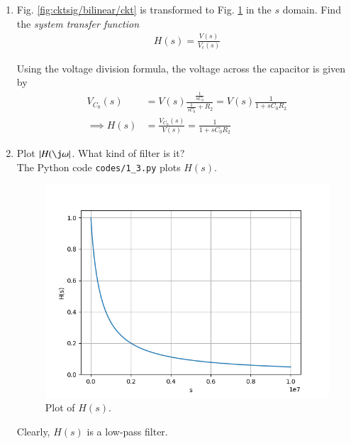 \documentclass[journal,12pt,twocolumn]{IEEEtran}
\renewcommand\thesection{\arabic{section}}
\begin{document}
\begin{enumerate}[label=\arabic*.,ref=\thesection.\theenumi]
\item Fig. \ref{fig:cktsig/bilinear/ckt} is transformed to 
Fig. \ref{fig:cktsig/bilinear/sckt} in the $s$ domain.
		Find  the {\em system transfer function}
\begin{align}
	H(s) = \frac{V(s)}{V_c(s)}
\end{align}
\begin{figure}[!htb]
    \begin{center}
	    
    \end{center}
\caption{}
\label{fig:cktsig/bilinear/sckt}
\end{figure}
\solution 
Using the voltage division formula, the voltage across 
the capacitor is given by
\begin{align}
	V_{C_0}(s) &= V(s)\frac{\frac{1}{sC_0}}{\frac{1}{sC_0} + R_2} 
           = V(s)\frac{1}{1 + sC_0R_2}
           \label{eq:cktsig/bilinear/vcs} \\
	\implies H(s) &= \frac{V_{C_0}(s)}{V(s)} = \frac{1}{1 + sC_0R_2}
    \label{eq:cktsig/bilinear/hs}
\end{align}
\item Plot $\abs{H(\j\omega}$. What kind of filter is it?
	\\
\solution 
\iffalse
		The Python code \texttt{codes/1\_3.py} plots $H(s)$.
\begin{figure}[!ht]
    \includegraphics[width=\columnwidth]{cktsig/figs/1_3.png}
    \caption{Plot of $H(s)$.}
    \label{fig:cktsig/bilinear/hs}
\end{figure}
Clearly, $H(s)$ is a low-pass filter.

\end{enumerate}
\end{document}
